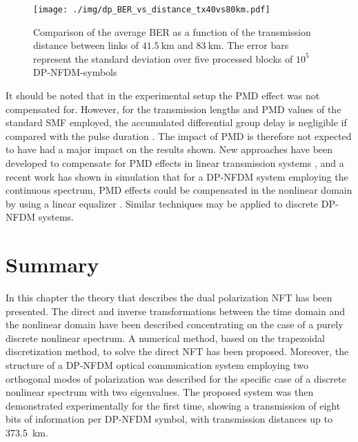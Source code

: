 \begin{figure}[tb]
  \centering
  \texttt{[image: ./img/dp\_BER\_vs\_distance\_tx40vs80km.pdf]}
  \caption{Comparison of the average \ac{BER} as a function of the transmission distance between links of $\SI{41.5}{\km}$ and $\SI{83}{\km}$. The error bars represent the standard deviation over five processed blocks of $10^5$ \ac{DP-NFDM}-symbols}
  \label{fig:tx_performance_40vs80}
\end{figure}

It should be noted that in the experimental setup the \ac{PMD} effect was not compensated for.
However, for the transmission lengths and \ac{PMD} values of the standard \ac{SMF} employed, the accumulated differential group delay is negligible if compared with the pulse duration \cite{Agrawal12_NonlinearFOs_Book}. The impact of \ac{PMD} is therefore not expected to have had a major impact on the results shown. New approaches have been developed to compensate for PMD  effects in linear transmission systems \cite{kikuchi2011analyses}, and a recent work has shown in simulation that for a  \ac{DP-NFDM} system employing the continuous spectrum, \ac{PMD} effects could be compensated in the nonlinear domain by using a linear equalizer \cite{Goossens:17}. Similar techniques may be applied to discrete \ac{DP-NFDM} systems.



\section{Summary}\label{sec:nfdm_summary}

In this chapter the theory that describes the dual polarization NFT has been presented. The direct and inverse transformations between the time domain and the nonlinear domain have been described concentrating on the case of a purely discrete nonlinear spectrum. A numerical method, based on the trapezoidal discretization method, to solve the direct \ac{NFT} has been proposed. Moreover, the structure of a \ac{DP-NFDM} optical communication system employing two orthogonal modes of polarization was described for the specific case of a discrete nonlinear spectrum with two eigenvalues.
The proposed system was then demonstrated experimentally for the first time, showing a transmission of eight bits of information per \ac{DP-NFDM} symbol, with transmission distances up to \SI{373.5}{\km}.



